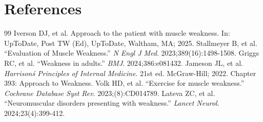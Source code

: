 \section*{References}
\begin{thebibliography}{99}
 Iverson DJ, et al. Approach to the patient with muscle weakness. In: UpToDate, Post TW (Ed), UpToDate, Waltham, MA; 2025.
 Stallmeyer B, et al. ``Evaluation of Muscle Weakness.'' \emph{N Engl J Med}. 2023;389(16):1498-1508.
 Griggs RC, et al. ``Weakness in adults.'' \emph{BMJ}. 2024;386:e081432.
 Jameson JL, et al. \emph{Harrison\'s Principles of Internal Medicine}. 21st ed. McGraw-Hill; 2022. Chapter 393: Approach to Weakness.
 Volk HD, et al. ``Exercise for muscle weakness.'' \emph{Cochrane Database Syst Rev}. 2023;(8):CD014789.
 Lateva ZC, et al. ``Neuromuscular disorders presenting with weakness.'' \emph{Lancet Neurol}. 2024;23(4):399-412.
\end{thebibliography}

